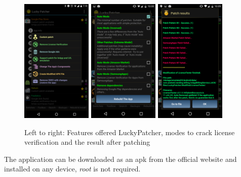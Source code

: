 \begin{figure}[h]
    \centering
    \includegraphics[width=0.3\textwidth]{data/luckyFeatures.png}
    \includegraphics[width=0.3\textwidth]{data/luckyModi.png}
    \includegraphics[width=0.3\textwidth]{data/luckyPatching.png}
    \caption{Left to right: Features offered LuckyPatcher, modes to crack license verification and the result after patching}
    \label{fig:luckyScreen}
\end{figure}
The application can be downloaded as an \gls{apk} from the official website \cite{luckyPatcherOfficial} and installed on any device, \textit{root} is not required.
